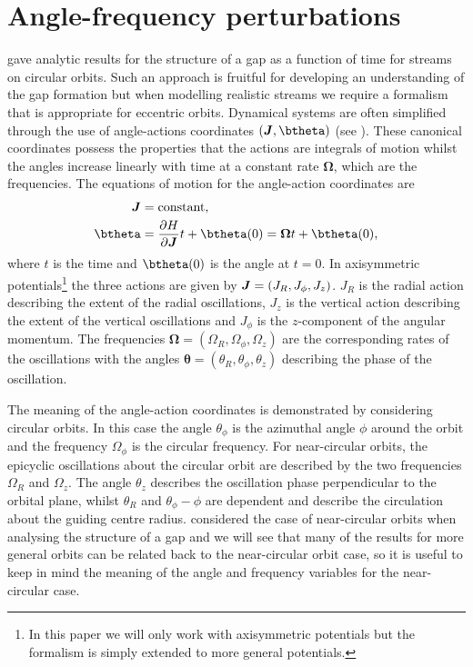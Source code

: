 \documentclass[useAMS,usenatbib,fleqn,a4paper]{mn2e}
\newcommand{\bs}[1]{\bmath{#1}}
\begin{document}
\section{Angle-frequency perturbations}\label{Sec::Formalism_angfreq}
\cite{ErkalBelokurov2015} gave analytic results for the structure of a gap as a function of time for streams on circular orbits. Such an approach is fruitful for developing an understanding of the gap formation but when modelling realistic streams we require a formalism that is appropriate for eccentric orbits. Dynamical systems are often simplified through the use of angle-actions coordinates $(\bs{J},\btheta)$ (see \citealt{BinneyTremaine}). These canonical coordinates possess the properties that the actions are integrals of motion whilst the angles increase linearly with time at a constant rate $\boldsymbol{\Omega}$, which are the frequencies. The equations of motion for the angle-action coordinates are
\begin{equation}
\begin{split}
\bs{J}&=\mathrm{constant},\\
\btheta&=\frac{\partial H}{\partial\boldsymbol{J}}t+\btheta(0)=\boldsymbol{\Omega}t+\btheta(0),
\end{split}
\end{equation}
where $t$ is the time and $\btheta(0)$ is the angle at $t=0$. In axisymmetric potentials\footnote{In this paper we will only work with axisymmetric potentials but the formalism is simply extended to more general potentials.} the three actions are given by $\bs{J}=(J_R,J_\phi,J_z)$. $J_R$ is the radial action describing the extent of the radial oscillations, $J_z$ is the vertical action describing the extent of the vertical oscillations and $J_\phi$ is the $z$-component of the angular momentum. The frequencies $\boldsymbol{\Omega}=(\Omega_R,\Omega_\phi,\Omega_z)$  are the corresponding rates of the oscillations with the angles $\boldsymbol{\theta}=(\theta_R,\theta_\phi,\theta_z)$ describing the phase of the oscillation.

The meaning of the angle-action coordinates is demonstrated by considering circular orbits. In this case the angle $\theta_\phi$ is the azimuthal angle $\phi$ around the orbit and the frequency $\Omega_\phi$ is the circular frequency. For near-circular orbits, the epicyclic oscillations about the circular orbit are described by the two frequencies $\Omega_R$ and $\Omega_z$. The angle $\theta_z$ describes the oscillation phase perpendicular to the orbital plane, whilst $\theta_R$ and $\theta_\phi-\phi$ are dependent and describe the circulation about the guiding centre radius. \cite{ErkalBelokurov2015} considered the case of near-circular orbits when analysing the structure of a gap and we will see that many of the results for more general orbits can be related back to the near-circular orbit case, so it is useful to keep in mind the meaning of the angle and frequency variables for the near-circular case.
\end{document}
